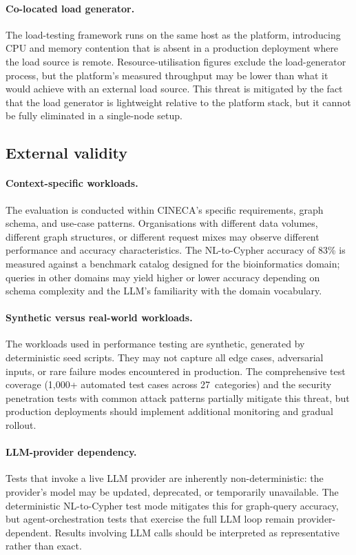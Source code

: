 \documentclass[a4paper,noexaminfo]{sapthesis}
\newcommand{\TestCount}{1,000+}
\begin{document}
\paragraph{Co-located load generator.}
The load-testing framework runs on the same host as the platform,
introducing CPU and memory contention that is absent in a production
deployment where the load source is remote.  Resource-utilisation
figures exclude the load-generator process, but the platform's
measured throughput may be lower than what it would achieve with an
external load source.  This threat is mitigated by the fact that the
load generator is lightweight relative to the platform stack, but it
cannot be fully eliminated in a single-node setup.

\subsection{External validity}

\paragraph{Context-specific workloads.}
The evaluation is conducted within CINECA's specific requirements, graph
schema, and use-case patterns.  Organisations with different data
volumes, different graph structures, or different request mixes may
observe different performance and accuracy characteristics.  The NL-to-Cypher
accuracy of 83\% is measured against a benchmark catalog designed for
the bioinformatics domain; queries in other domains may yield higher or
lower accuracy depending on schema complexity and the LLM's familiarity
with the domain vocabulary.

\paragraph{Synthetic versus real-world workloads.}
The workloads used in performance testing are synthetic, generated by
deterministic seed scripts.  They may not capture all edge cases,
adversarial inputs, or rare failure modes encountered in production.
The comprehensive test coverage (\TestCount{} automated test cases
across 27~categories) and the security penetration tests with common
attack patterns partially mitigate this threat, but production
deployments should implement additional monitoring and gradual rollout.

\paragraph{LLM-provider dependency.}
Tests that invoke a live LLM provider are inherently non-deterministic:
the provider's model may be updated, deprecated, or temporarily
unavailable.  The deterministic NL-to-Cypher test mode mitigates this
for graph-query accuracy, but agent-orchestration tests that exercise
the full LLM loop remain provider-dependent.  Results involving LLM
calls should be interpreted as representative rather than exact.
\end{document}
